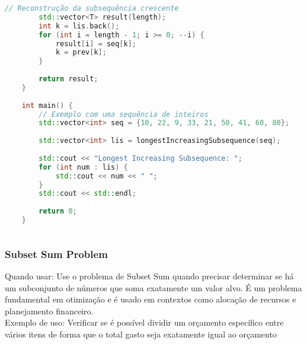 \documentclass{article}
\begin{document}
\begin{lstlisting}[language=C++, caption=Longest Increasing Subsequence]
        // Reconstrução da subsequência crescente
        std::vector<T> result(length);
        int k = lis.back();
        for (int i = length - 1; i >= 0; --i) {
            result[i] = seq[k];
            k = prev[k];
        }
    
        return result;
    }
    
    int main() {
        // Exemplo com uma sequência de inteiros
        std::vector<int> seq = {10, 22, 9, 33, 21, 50, 41, 60, 80};
        
        std::vector<int> lis = longestIncreasingSubsequence(seq);
    
        std::cout << "Longest Increasing Subsequence: ";
        for (int num : lis) {
            std::cout << num << " ";
        }
        std::cout << std::endl;
    
        return 0;
    }
    
\end{lstlisting}

\subsubsection{Subset Sum Problem}

Quando usar: Use o problema de Subset Sum quando precisar determinar se há um subconjunto de números que soma exatamente um valor alvo. É um problema fundamental em otimização e é usado em contextos como alocação de recursos e planejamento financeiro.
\\Exemplo de uso: Verificar se é possível dividir um orçamento específico entre vários itens de forma que o total gasto seja exatamente igual ao orçamento
\end{document}
